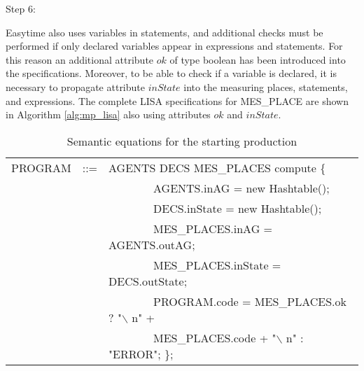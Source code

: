 \documentclass[preprint, prX]{revtex4}
\begin{document}
Step 6:

Easytime also uses variables in statements, and additional checks must be performed if only declared variables appear in expressions and statements. For this reason an additional attribute $ok$ of type boolean has been introduced into the specifications. Moreover, to be able to check if a variable is declared, it is necessary to propagate attribute $inState$ into the measuring places, statements, and expressions. The complete LISA specifications for MES\_PLACE are shown in Algorithm \ref{alg:mp_lisa} also using attributes $ok$ and $inState$.

\begin{table}[htb]           \caption{Semantic equations for the starting production}
\label{tab:tab28}
\footnotesize
\vspace{-5mm}
\begin{center}
\begin{tabular}{ | l  l  l | }
\hline
 PROGRAM & ::= & AGENTS DECS MES\_PLACES  compute \{ \\
 & &  \ \ \ \ \ \ \ \ AGENTS.inAG = new Hashtable(); \\
 & &  \ \ \ \ \ \ \ \ DECS.inState = new Hashtable(); \\
 & &  \ \ \ \ \ \ \ \ MES\_PLACES.inAG = AGENTS.outAG; \\
 & &  \ \ \ \ \ \ \ \ MES\_PLACES.inState = DECS.outState; \\
 & &  \ \ \ \ \ \ \ \ PROGRAM.code = MES\_PLACES.ok ? "$\backslash$ n" + \\
 & &  \ \ \ \ \ \ \ \ MES\_PLACES.code + "$\backslash$ n" : "ERROR"; \}; \\
\hline
\end{tabular}
\end{center}
\vspace{-5mm}
\normalsize
\end{table}
\end{document}
